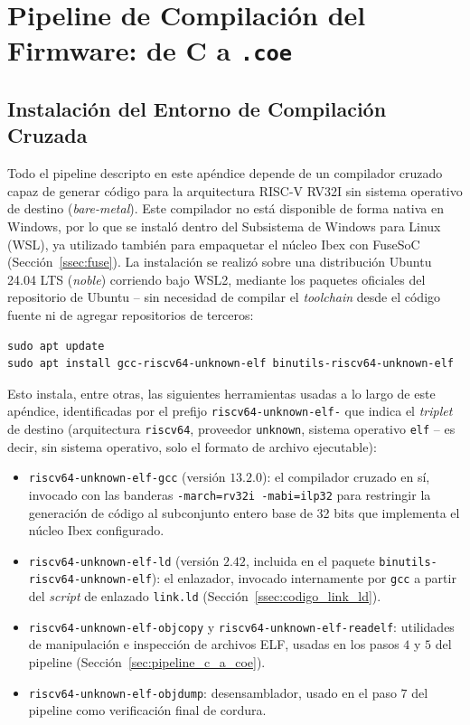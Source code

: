 \chapter{Pipeline de Compilación del Firmware: de C a \texttt{.coe}}
\label{ap:pipeline_firmware}

\section{Instalación del Entorno de Compilación Cruzada}
\label{sec:instalacion_toolchain}

Todo el pipeline descripto en este apéndice depende de un compilador
cruzado capaz de generar código para la arquitectura RISC-V RV32I sin
sistema operativo de destino (\textit{bare-metal}). Este compilador no
está disponible de forma nativa en Windows, por lo que se instaló dentro
del Subsistema de Windows para Linux (WSL), ya utilizado también para
empaquetar el núcleo Ibex con FuseSoC (Sección~\ref{ssec:fuse}). La
instalación se realizó sobre una distribución Ubuntu 24.04 LTS
(\textit{noble}) corriendo bajo WSL2, mediante los paquetes oficiales del
repositorio de Ubuntu -- sin necesidad de compilar el \textit{toolchain}
desde el código fuente ni de agregar repositorios de terceros:
\begin{lstlisting}[style=bashstyle]
sudo apt update
sudo apt install gcc-riscv64-unknown-elf binutils-riscv64-unknown-elf
\end{lstlisting}

Esto instala, entre otras, las siguientes herramientas usadas a lo largo
de este apéndice, identificadas por el prefijo \texttt{riscv64-unknown-elf-}
que indica el \textit{triplet} de destino (arquitectura \texttt{riscv64},
proveedor \texttt{unknown}, sistema operativo \texttt{elf} -- es decir,
sin sistema operativo, solo el formato de archivo ejecutable):
\begin{itemize}
    \item \texttt{riscv64-unknown-elf-gcc} (versión $13.2.0$): el
    compilador cruzado en sí, invocado con las banderas
    \texttt{-march=rv32i -mabi=ilp32} para restringir la generación de
    código al subconjunto entero base de 32 bits que implementa el
    núcleo Ibex configurado.
    \item \texttt{riscv64-unknown-elf-ld} (versión $2.42$, incluida en el
    paquete \texttt{binutils-riscv64-unknown-elf}): el enlazador, invocado
    internamente por \texttt{gcc} a partir del \textit{script} de
    enlazado \texttt{link.ld} (Sección~\ref{ssec:codigo_link_ld}).
    \item \texttt{riscv64-unknown-elf-objcopy} y
    \texttt{riscv64-unknown-elf-readelf}: utilidades de manipulación e
    inspección de archivos ELF, usadas en los pasos $4$ y $5$ del pipeline
    (Sección~\ref{sec:pipeline_c_a_coe}).
    \item \texttt{riscv64-unknown-elf-objdump}: desensamblador, usado en
    el paso $7$ del pipeline como verificación final de cordura.
\end{itemize}

